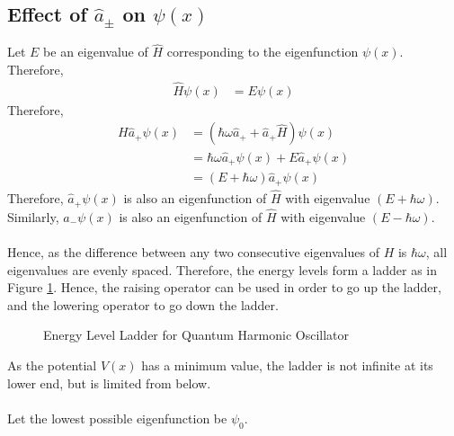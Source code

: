 \documentclass[titlepage, fleqn, a4paper, 12pt, twoside]{article}
\theoremstyle{definition}
\theoremstyle{theorem}
\begin{document}
\subsection{Effect of $\hat{a}_{\pm}$ on $\psi(x)$}

Let $E$ be an eigenvalue of $\hat{H}$ corresponding to the eigenfunction $\psi(x)$.\\
Therefore,
\begin{align*}
	\hat{H} \psi(x) &= E \psi(x)
\end{align*}
Therefore,
\begin{align*}
	H \hat{a}_+ \psi(x) &= \left( \hbar \omega \hat{a}_+ + \hat{a}_+ \hat{H} \right) \psi(x)\\
	&= \hbar \omega \hat{a}_+ \psi(x) + E \hat{a}_+ \psi(x)\\
	&= (E + \hbar \omega) \hat{a}_+ \psi(x)
\end{align*}
Therefore, $\hat{a}_+ \psi(x)$ is also an eigenfunction of $\hat{H}$ with eigenvalue $(E + \hbar \omega)$.\\
Similarly, $\hat{a}_- \psi(x)$ is also an eigenfunction of $\hat{H}$ with eigenvalue $(E - \hbar \omega)$.\\
~\\
Hence, as the difference between any two consecutive eigenvalues of $H$ is $\hbar \omega$, all eigenvalues are evenly spaced.
Therefore, the energy levels form a ladder as in Figure \ref{fig:Energy_Level_Ladder_for_Quantum_Harmonic_Oscillator}.
Hence, the raising operator can be used in order to go up the ladder, and the lowering operator to go down the ladder.
\begin{figure}[h]
	\centering
	\caption{Energy Level Ladder for Quantum Harmonic Oscillator}
	\label{fig:Energy_Level_Ladder_for_Quantum_Harmonic_Oscillator}
\end{figure}
As the potential $V(x)$ has a minimum value, the ladder is not infinite at its lower end, but is limited from below.\\
~\\
Let the lowest possible eigenfunction be $\psi_0$.
\end{document}
